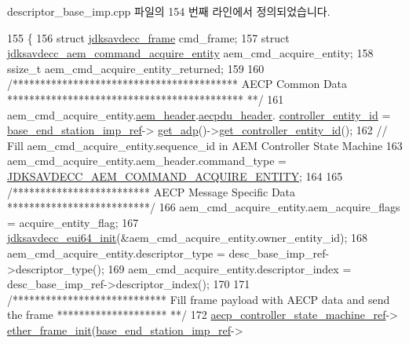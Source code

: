 descriptor\+\_\+base\+\_\+imp.\+cpp 파일의 154 번째 라인에서 정의되었습니다.


\begin{DoxyCode}
155 \{
156     \textcolor{keyword}{struct }\hyperlink{structjdksavdecc__frame}{jdksavdecc\_frame} cmd\_frame;
157     \textcolor{keyword}{struct }\hyperlink{structjdksavdecc__aem__command__acquire__entity}{jdksavdecc\_aem\_command\_acquire\_entity} 
      aem\_cmd\_acquire\_entity;
158     ssize\_t aem\_cmd\_acquire\_entity\_returned;
159 
160     \textcolor{comment}{/***************************************** AECP Common Data *******************************************
      **/}
161     aem\_cmd\_acquire\_entity.\hyperlink{structjdksavdecc__aem__command__acquire__entity_ae1e77ccb75ff5021ad923221eab38294}{aem\_header}.\hyperlink{structjdksavdecc__aecpdu__aem_ae8460ae179666e7ce268ed1ef33d0de3}{aecpdu\_header}.
      \hyperlink{structjdksavdecc__aecpdu__common_affc928ddb4fc62d1d04a775d36e5f2c8}{controller\_entity\_id} = \hyperlink{classavdecc__lib_1_1descriptor__base__imp_a550c969411f5f3b69f55cc139763d224}{base\_end\_station\_imp\_ref}->
      \hyperlink{classavdecc__lib_1_1end__station__imp_a471a74540ce6182fad0c17dfd010107e}{get\_adp}()->\hyperlink{classavdecc__lib_1_1adp_a0c0959a46658c0a22e9530334b2912da}{get\_controller\_entity\_id}();
162     \textcolor{comment}{// Fill aem\_cmd\_acquire\_entity.sequence\_id in AEM Controller State Machine}
163     aem\_cmd\_acquire\_entity.aem\_header.command\_type = 
      \hyperlink{group__command_ga74ebee0a0531409bb10f7ce9e1216c04}{JDKSAVDECC\_AEM\_COMMAND\_ACQUIRE\_ENTITY};
164 
165     \textcolor{comment}{/************************* AECP Message Specific Data **************************/}
166     aem\_cmd\_acquire\_entity.aem\_acquire\_flags = acquire\_entity\_flag;
167     \hyperlink{group__eui64_ga6eda4ed21b6f0d526b180ac633eeba69}{jdksavdecc\_eui64\_init}(&aem\_cmd\_acquire\_entity.owner\_entity\_id);
168     aem\_cmd\_acquire\_entity.descriptor\_type = desc\_base\_imp\_ref->descriptor\_type();
169     aem\_cmd\_acquire\_entity.descriptor\_index = desc\_base\_imp\_ref->descriptor\_index();
170 
171     \textcolor{comment}{/**************************** Fill frame payload with AECP data and send the frame ********************
      **/}
172     \hyperlink{namespaceavdecc__lib_a0b1b5aea3c0490f77cbfd9178af5be22}{aecp\_controller\_state\_machine\_ref}->
      \hyperlink{classavdecc__lib_1_1aecp__controller__state__machine_a86ff947c5e6b799cfb877d3767bfa1f9}{ether\_frame\_init}(\hyperlink{classavdecc__lib_1_1descriptor__base__imp_a550c969411f5f3b69f55cc139763d224}{base\_end\_station\_imp\_ref}->

\end{DoxyCode}
